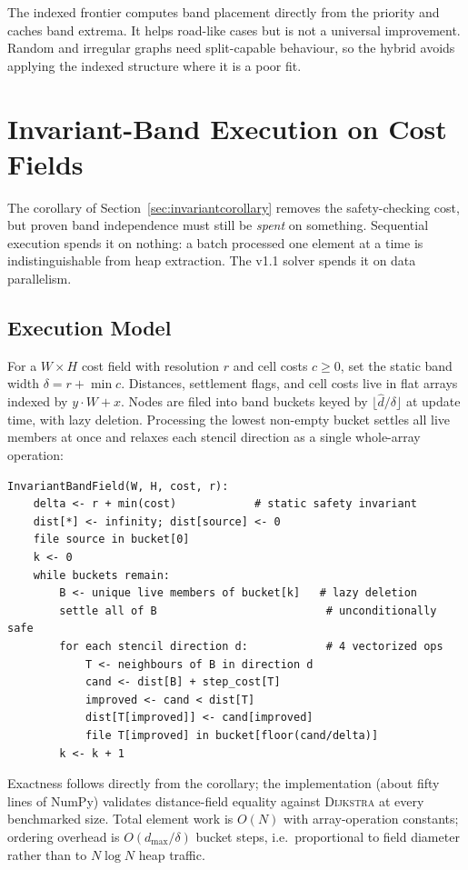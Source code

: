 \documentclass[11pt]{article}
\newcommand{\Dijkstra}{\textsc{Dijkstra}}
\begin{document}
The indexed frontier computes band placement directly from the priority and caches band extrema. It helps road-like cases but is not a universal improvement. Random and irregular graphs need split-capable behaviour, so the hybrid avoids applying the indexed structure where it is a poor fit.

\section{Invariant-Band Execution on Cost Fields}
\label{sec:invariant}

The corollary of Section~\ref{sec:invariantcorollary} removes the safety-checking cost, but proven band independence must still be \emph{spent} on something. Sequential execution spends it on nothing: a batch processed one element at a time is indistinguishable from heap extraction. The v1.1 solver spends it on data parallelism.

\subsection{Execution Model}

For a $W\times H$ cost field with resolution $r$ and cell costs $c\ge 0$, set the static band width $\delta = r + \min c$. Distances, settlement flags, and cell costs live in flat arrays indexed by $y\cdot W+x$. Nodes are filed into band buckets keyed by $\lfloor \hat d/\delta\rfloor$ at update time, with lazy deletion. Processing the lowest non-empty bucket settles all live members at once and relaxes each stencil direction as a single whole-array operation:

\begin{verbatim}
InvariantBandField(W, H, cost, r):
    delta <- r + min(cost)            # static safety invariant
    dist[*] <- infinity; dist[source] <- 0
    file source in bucket[0]
    k <- 0
    while buckets remain:
        B <- unique live members of bucket[k]   # lazy deletion
        settle all of B                          # unconditionally safe
        for each stencil direction d:            # 4 vectorized ops
            T <- neighbours of B in direction d
            cand <- dist[B] + step_cost[T]
            improved <- cand < dist[T]
            dist[T[improved]] <- cand[improved]
            file T[improved] in bucket[floor(cand/delta)]
        k <- k + 1
\end{verbatim}

Exactness follows directly from the corollary; the implementation (about fifty lines of NumPy) validates distance-field equality against \Dijkstra{} at every benchmarked size. Total element work is $O(N)$ with array-operation constants; ordering overhead is $O(d_{\max}/\delta)$ bucket steps, i.e.\ proportional to field diameter rather than to $N\log N$ heap traffic.
\end{document}
